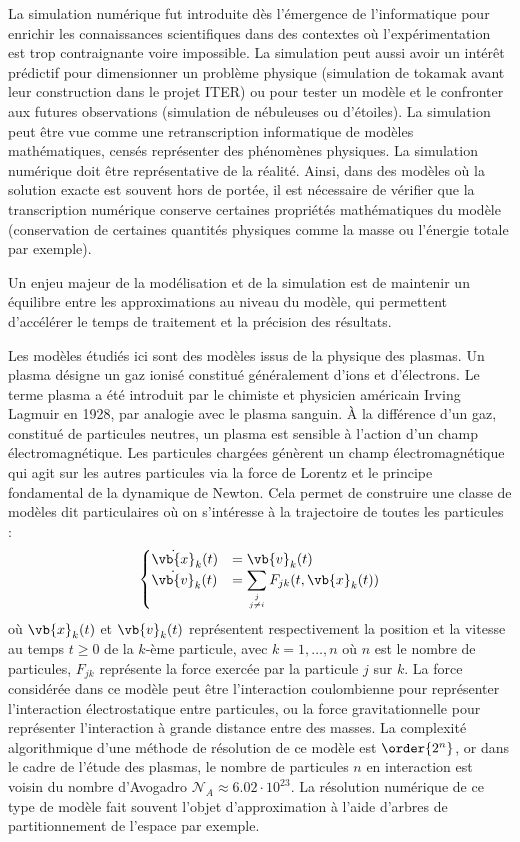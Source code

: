 
La simulation numérique fut introduite dès l’émergence de l’informatique pour enrichir les connaissances scientifiques dans des contextes où l’expérimentation est trop contraignante voire impossible. La simulation peut aussi avoir un intérêt prédictif pour dimensionner un problème physique (simulation de tokamak avant leur construction dans le projet ITER) ou pour tester un modèle et le confronter aux futures observations (simulation de nébuleuses ou d’étoiles). La simulation peut être vue comme une retranscription informatique de modèles mathématiques, censés représenter des phénomènes physiques. La simulation numérique doit être représentative de la réalité. Ainsi, dans des modèles où la solution exacte est souvent hors de portée, il est nécessaire de vérifier que la transcription numérique conserve certaines propriétés mathématiques du modèle (conservation de certaines quantités physiques comme la masse ou l’énergie totale par exemple).

Un enjeu majeur de la modélisation et de la simulation est de maintenir un équilibre entre les approximations au niveau du modèle, qui permettent d’accélérer le temps de traitement et la précision des résultats.

Les modèles étudiés ici sont des modèles issus de la physique des plasmas. Un plasma désigne un gaz ionisé constitué généralement d'ions et d'électrons. Le terme plasma a été introduit par le chimiste et physicien américain Irving Lagmuir en 1928, par analogie avec le plasma sanguin. À la différence d'un gaz, constitué de particules neutres, un plasma est sensible à l'action d'un champ électromagnétique. Les particules chargées génèrent un champ électromagnétique qui agit sur les autres particules via la force de Lorentz et le principe fondamental de la dynamique de Newton. Cela permet de construire une classe de modèles dit particulaires où on s'intéresse à la trajectoire de toutes les particules :
$$
  \begin{cases}
    \dot{\vb{x}}_k(t) &= \vb{v}_k(t) \\
    \dot{\vb{v}}_k(t) &= \displaystyle\sum_{j\atop j\neq i} F_{jk}(t,\vb{x}_k(t))
  \end{cases}
$$
où $\vb{x}_k(t)$ et $\vb{v}_k(t)$ représentent respectivement la position et la vitesse au temps $t\geq0$ de la $k$-ème particule, avec $k=1,\dots,n$ où $n$ est le nombre de particules, $F_{jk}$ représente la force exercée par la particule $j$ sur $k$. La force considérée dans ce modèle peut être l'interaction coulombienne pour représenter l'interaction électrostatique entre particules, ou la force gravitationnelle pour représenter l'interaction à grande distance entre des masses. La complexité algorithmique d'une méthode de résolution de ce modèle est $\order{2^n}$, or dans le cadre de l'étude des plasmas, le nombre de particules $n$ en interaction est voisin du nombre d'Avogadro $\mathcal{N}_A\approx 6.02\cdot 10^{23}$. La résolution numérique de ce type de modèle fait souvent l'objet d'approximation à l'aide d'arbres de partitionnement de l'espace par exemple.

